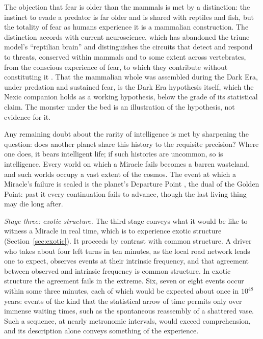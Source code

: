 The objection that fear is older than the mammals is met by a distinction:
the instinct to evade a predator is far older and is shared with reptiles
and fish, but the totality of fear as humans experience it is a mammalian
construction. The distinction accords with current neuroscience, which has
abandoned the triune model's ``reptilian brain'' \cite{Cesario20} and
distinguishes the circuits that detect and respond to threats, conserved
within mammals and to some extent across vertebrates, from the conscious
experience of fear, to which they contribute without constituting it
\cite{LeDoux14}. That the mammalian whole was assembled during the Dark Era,
under predation and sustained fear, is the Dark Era hypothesis itself, which
the Nexic companion holds as a working hypothesis, below the grade of its
statistical claim. The monster under the bed is an illustration of the
hypothesis, not evidence for it.

Any remaining doubt about the rarity of intelligence is met by sharpening
the question: does another planet share this history to the requisite
precision? Where one does, it bears intelligent life; if such histories are
uncommon, so is intelligence. Every world on which a Miracle fails becomes a
barren wasteland, and such worlds occupy a vast extent of the cosmos. The
event at which a Miracle's failure is sealed is the planet's Departure Point
\cite{GoldenReasoning}, the dual of the Golden Point: past it every
continuation fails to advance, though the last living thing may die long
after.

\emph{Stage three: exotic structure.} The third stage conveys what it would
be like to witness a Miracle in real time, which is to experience exotic
structure (Section~\ref{sec:exotic}). It proceeds by contrast with common
structure. A driver who takes about four left turns in ten minutes, as the
local road network leads one to expect, observes events at their intrinsic
frequency, and that agreement between observed and intrinsic frequency is
common structure. In exotic structure the agreement fails in the extreme.
Six, seven or eight events occur within some three minutes, each of which
would be expected about once in $10^{48}$ years: events of the kind that the
statistical arrow of time permits only over immense waiting times, such as
the spontaneous reassembly of a shattered vase. Such a sequence, at nearly
metronomic intervals, would exceed comprehension, and its description alone
conveys something of the experience.

